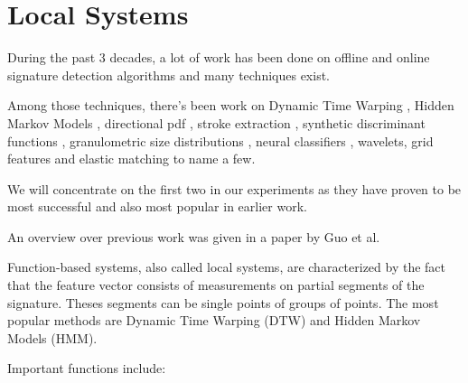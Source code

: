 \documentclass[a4paper, oneside]{csthesis}
\begin{document}





\section{Local Systems}
\label{sec:functions}



During the past 3 decades, a lot of work has been done on offline and online signature detection algorithms and many techniques exist.

Among those techniques, there's been work on Dynamic Time Warping \cite{Herbst98onan} \cite{citeulike:891512}, Hidden Markov Models \cite{Justino00anoff-line}, directional pdf \cite{drouhard_1996_pr}, stroke extraction \cite{1047809}, synthetic discriminant functions \cite{Wilkinson:91}, granulometric size distributions \cite{615447}, neural classifiers \cite{Bajaj19971}, wavelets\cite{Ramesh1999217}, grid features\cite{Qi19941621} and elastic matching\cite{citeulike:941886} to name a few. \cite{PiyushShanker:2007:OSV:1274199.1274423}

We will concentrate on the first two in our experiments as they have proven to be most successful and also most popular in earlier work.

An overview over previous work was given in a paper by Guo et al. \cite{Justino20051377}


Function-based systems, also called local systems, are characterized by the fact that the feature vector consists of measurements on partial segments of the signature. Theses segments can be single points of groups of points. The most popular methods are Dynamic Time Warping (DTW) and Hidden Markov Models (HMM).

Important functions include: \cite{Gueler2008940}
\end{document}
